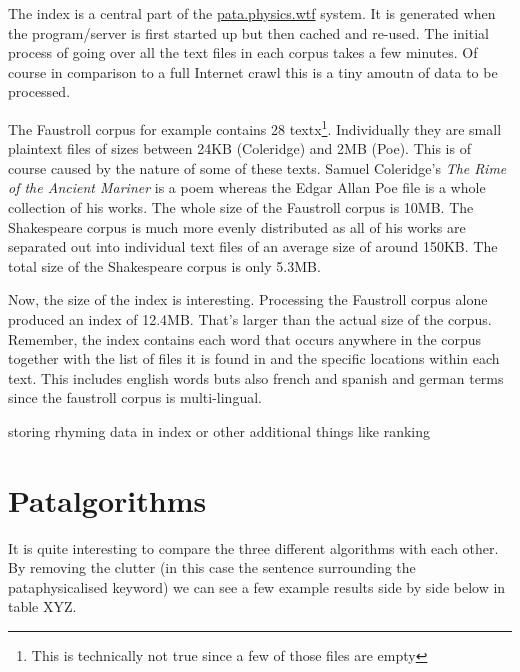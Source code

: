 The index is a central part of the \url{pata.physics.wtf} system. It is generated when the program/server is first started up but then cached and re-used. The initial process of going over all the text files in each corpus takes a few minutes. Of course in comparison to a full Internet crawl this is a tiny amoutn of data to be processed. 

The Faustroll corpus for example contains 28 textx\footnote{This is technically not true since a few of those files are empty}. Individually they are small plaintext files of sizes between 24KB (Coleridge) and 2MB (Poe). This is of course caused by the nature of some of these texts. Samuel Coleridge's \textit{The Rime of the Ancient Mariner} is a poem whereas the Edgar Allan Poe file is a whole collection of his works. The whole size of the Faustroll corpus is 10MB. The Shakespeare corpus is much more evenly distributed as all of his works are separated out into individual text files of an average size of around 150KB. The total size of the Shakespeare corpus is only 5.3MB.

Now, the size of the index is interesting. Processing the Faustroll corpus alone produced an index of 12.4MB. That's larger than the actual size of the corpus. Remember, the index contains each word that occurs anywhere in the corpus together with the list of files it is found in and the specific locations within each text. This includes english words buts also french and spanish and german terms since the faustroll corpus is multi-lingual.

storing rhyming data in index or other additional things like ranking


\section{Patalgorithms}

It is quite interesting to compare the three different algorithms with each other. By removing the clutter (in this case the sentence surrounding the pataphysicalised keyword) we can see a few example results side by side below in table XYZ.

